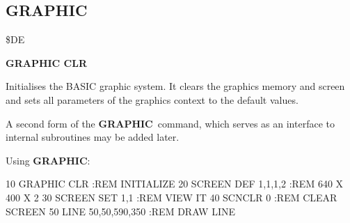 \subsection{GRAPHIC}
\begin{description}[leftmargin=3cm,style=nextline]
\item [Token:] \$DE
\item [Format:] {\bf GRAPHIC CLR}
\item [Usage:] Initialises the BASIC graphic system.
               It clears the graphics memory and screen and sets
               all parameters of the graphics context to the
               default values.

\item [Remarks:] A second form of the {\bf GRAPHIC} command,
               which serves as an interface to internal
               subroutines may be added later.

\item [Example:] Using {\bf GRAPHIC}:
\begin{screenoutput}
 10 GRAPHIC CLR         :REM INITIALIZE
 20 SCREEN DEF 1,1,1,2  :REM 640 X 400 X 2
 30 SCREEN SET 1,1      :REM VIEW IT
 40 SCNCLR 0            :REM CLEAR SCREEN
 50 LINE 50,50,590,350  :REM DRAW LINE
\end{screenoutput}
\end{description}


\newpage
